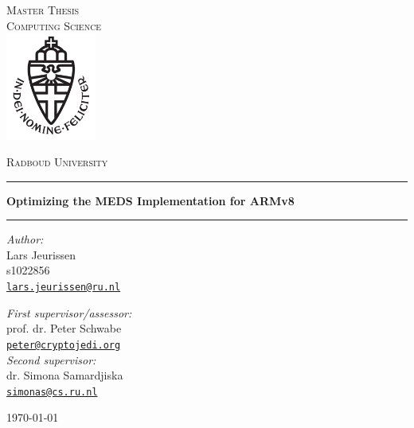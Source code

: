 \documentclass[11pt,a4paper]{report}
\theoremstyle{definition}
\begin{document}
\begin{titlepage}
  \begin{center}
    \textsc{\LARGE Master Thesis\\Computing Science}\\[1.5cm]
    \includegraphics[height=100pt]{logo}

    \vspace{0.4cm}
    \textsc{\Large Radboud University}\\[1cm]
    \hrule
    \vspace{0.4cm}
    \textbf{\huge Optimizing the MEDS Implementation for ARMv8}\\[0.4cm]
    \vspace{0.2cm}
    \hrule
    \vspace{2cm}
    \begin{minipage}[t]{0.45\textwidth}
      \begin{flushleft} \large
        \textit{Author:}\\
        Lars Jeurissen\\
        s1022856\\
        \texttt{\href{mailto:lars.jeurissen@ru.nl}{lars.jeurissen@ru.nl}}
      \end{flushleft}
    \end{minipage}
    \begin{minipage}[t]{0.45\textwidth}
      \begin{flushright} \large
        \textit{First supervisor/assessor:}\\
        prof. dr. Peter Schwabe\\
        \texttt{\href{mailto:peter@cryptojedi.org}{peter@cryptojedi.org}}\\[1.3cm]
        \textit{Second supervisor:}\\
        dr. Simona Samardjiska\\
        \texttt{\href{mailto:simonas@cs.ru.nl}{simonas@cs.ru.nl}}
      \end{flushright}
    \end{minipage}
    \vfill
    {\large \today}
  \end{center}
\end{titlepage}
\end{document}
